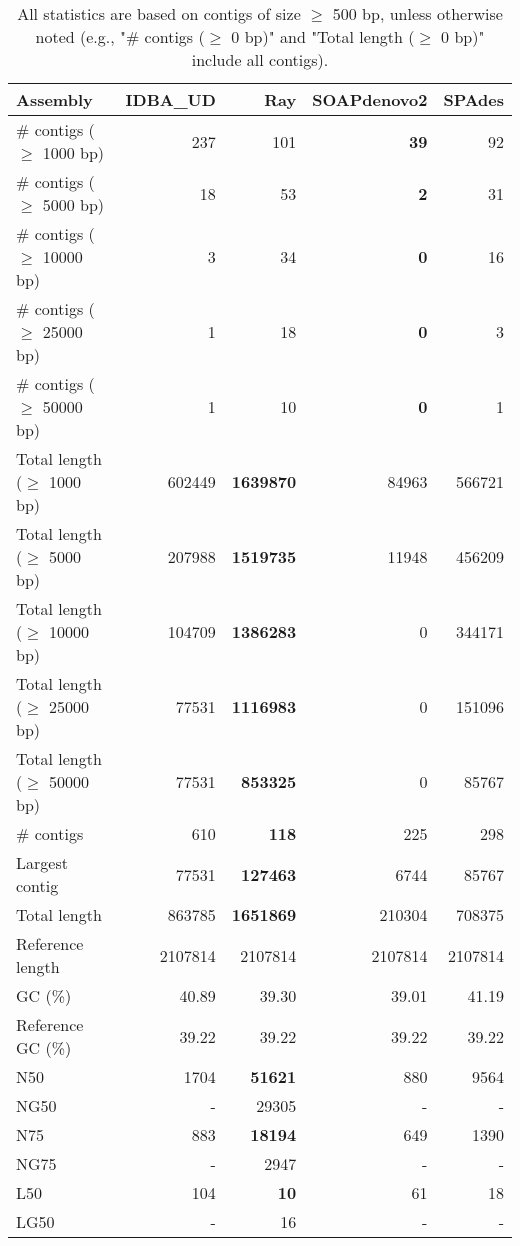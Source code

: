 \documentclass[12pt,a4paper]{article}
\begin{document}
\begin{table}[ht]
\begin{center}
\caption{All statistics are based on contigs of size $\geq$ 500 bp, unless otherwise noted (e.g., "\# contigs ($\geq$ 0 bp)" and "Total length ($\geq$ 0 bp)" include all contigs).}
\begin{tabular}{|l*{4}{|r}|}
\hline
Assembly & IDBA\_UD & Ray & SOAPdenovo2 & SPAdes \\ \hline
\# contigs ($\geq$ 1000 bp) & 237 & 101 & {\bf 39} & 92 \\ \hline
\# contigs ($\geq$ 5000 bp) & 18 & 53 & {\bf 2} & 31 \\ \hline
\# contigs ($\geq$ 10000 bp) & 3 & 34 & {\bf 0} & 16 \\ \hline
\# contigs ($\geq$ 25000 bp) & 1 & 18 & {\bf 0} & 3 \\ \hline
\# contigs ($\geq$ 50000 bp) & 1 & 10 & {\bf 0} & 1 \\ \hline
Total length ($\geq$ 1000 bp) & 602449 & {\bf 1639870} & 84963 & 566721 \\ \hline
Total length ($\geq$ 5000 bp) & 207988 & {\bf 1519735} & 11948 & 456209 \\ \hline
Total length ($\geq$ 10000 bp) & 104709 & {\bf 1386283} & 0 & 344171 \\ \hline
Total length ($\geq$ 25000 bp) & 77531 & {\bf 1116983} & 0 & 151096 \\ \hline
Total length ($\geq$ 50000 bp) & 77531 & {\bf 853325} & 0 & 85767 \\ \hline
\# contigs & 610 & {\bf 118} & 225 & 298 \\ \hline
Largest contig & 77531 & {\bf 127463} & 6744 & 85767 \\ \hline
Total length & 863785 & {\bf 1651869} & 210304 & 708375 \\ \hline
Reference length & 2107814 & 2107814 & 2107814 & 2107814 \\ \hline
GC (\%) & 40.89 & 39.30 & 39.01 & 41.19 \\ \hline
Reference GC (\%) & 39.22 & 39.22 & 39.22 & 39.22 \\ \hline
N50 & 1704 & {\bf 51621} & 880 & 9564 \\ \hline
NG50 & - & 29305 & - & - \\ \hline
N75 & 883 & {\bf 18194} & 649 & 1390 \\ \hline
NG75 & - & 2947 & - & - \\ \hline
L50 & 104 & {\bf 10} & 61 & 18 \\ \hline
LG50 & - & 16 & - & - \\ \hline

\end{tabular}
\end{center}
\end{table}
\end{document}
